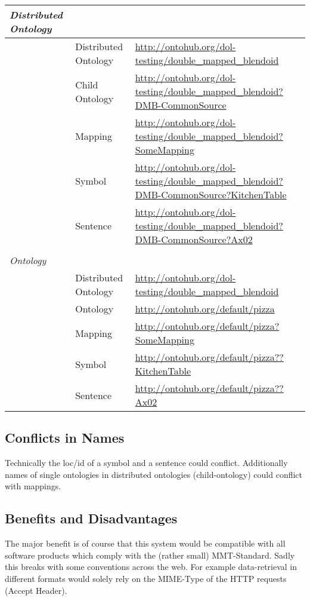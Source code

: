 \documentclass[a4paper,11pt,DIV=25]{scrartcl}
\begin{document}
\begin{tabularx}{\textwidth}{p{}p{}p{}}
  \textit{Distributed Ontology} & & \\
  \hline
  & Distributed Ontology & \url{http://ontohub.org/dol-testing/double_mapped_blendoid}\\
  & Child Ontology & \url{http://ontohub.org/dol-testing/double_mapped_blendoid?DMB-CommonSource}\\
  & Mapping & \url{http://ontohub.org/dol-testing/double_mapped_blendoid?SomeMapping}\\
  & Symbol & \url{http://ontohub.org/dol-testing/double_mapped_blendoid?DMB-CommonSource?KitchenTable}\\
  & Sentence & \url{http://ontohub.org/dol-testing/double_mapped_blendoid?DMB-CommonSource?Ax02}\\
  & & \\
  \textit{Ontology} & & \\
  \hline
  & Distributed Ontology & \url{http://ontohub.org/dol-testing/double_mapped_blendoid}\\
  & Ontology & \url{http://ontohub.org/default/pizza}\\
  & Mapping & \url{http://ontohub.org/default/pizza?SomeMapping}\\
  & Symbol & \url{http://ontohub.org/default/pizza??KitchenTable}\\
  & Sentence & \url{http://ontohub.org/default/pizza??Ax02}\\
\end{tabularx}

\subsection{Conflicts in Names}

Technically the loc/id of a symbol and a sentence could conflict. Additionally
names of single ontologies in distributed ontologies (child-ontology) could
conflict with mappings.

\subsection{Benefits and Disadvantages}

The major benefit is of course that this system would be compatible with all
software products which comply with the (rather small) MMT-Standard.  Sadly
this breaks with some conventions across the web. For example data-retrieval in
different formats would solely rely on the MIME-Type of the HTTP requests
(Accept Header).
\end{document}
